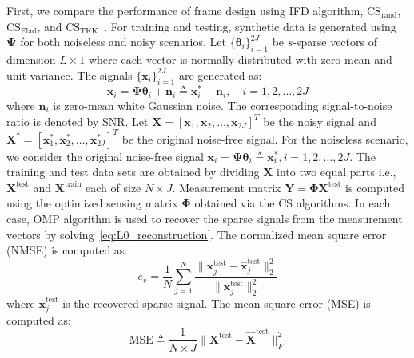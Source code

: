 First, we compare the performance of frame design using IFD algorithm, $\text{CS}_{\text{rand}}$, $\text{CS}_{\text{Elad}}$, and $\text{CS}_{\text{TKK}}$~\cite{Eva_frame}. For training and testing, synthetic data is generated using $\bm{\Psi}$ for both noiseless and noisy scenarios. Let $\{\bm{\theta}_{i}\}_{i=1}^{2J}$ be $s$-sparse vectors of dimension $L\times1$ where each vector is normally distributed with zero mean and unit variance. The signals $\{\bm{x}_{i}\}_{i=1}^{2J}$ are generated as:
%
\begin{equation}
    \label{eq: Signal_generation}
    \bm{x}_{i}= \bm{\Psi} \bm{\theta}_{i} + \bm{n}_{i} \triangleq \bm{x}_{i}^{*} + \bm{n}_{i}, \quad i=1,2,\dots,2J
\end{equation}
%
where $\bm{n}_{i}$ is zero-mean white Gaussian noise. The corresponding signal-to-noise ratio is denoted by SNR. Let $\bm{X}= \left[ \bm{x}_{1}, \bm{x}_{2},\dots,\bm{x}_{2J} \right]^{T}$ be the noisy signal and $\bm{X}^{*}= \left[ \bm{x}_{1}^{*}, \bm{x}_{2}^{*},\dots,\bm{x}_{2J}^{*} \right]^{T}$ be the original noise-free signal. For the noiseless scenario, we consider the original noise-free signal $\bm{x}_{i}= \bm{\Psi} \bm{\theta}_{i} \triangleq \bm{x}_{i}^{*}, i=1,2,\dots,2J$. The training and test data sets are obtained by dividing $\bm{X}$ into two equal parts i.e., $\bm{X}^{\text{test}}$ and $\bm{X}^{\text{train}}$ each of size $N\times J$. Measurement matrix $\bm{Y}=\bm{\Phi} \bm{X}^{\text{test}}$ is computed using the optimized sensing matrix $\bm{\Phi}$ obtained via the CS algorithms. In each case, OMP algorithm is used to recover the sparse signals from the measurement vectors by solving~\eqref{eq:L0_reconstruction}. The normalized mean square error (NMSE) is computed as:
%
\begin{equation}
\label{eq: NMSE_42}
e_{r} = \frac{1}{N} \sum_{j=1}^{N} \frac{\|\bm{x}_{j}^{\text{test}}-\widehat{\bm{x}}_{j}^{\text{test}}\|_{2}^{2}}{\|\bm{x}_{j}^{\text{test}}\|_{2}^{2}} 
\end{equation}
%
where $\widehat{\bm{x}}^{\text{test}}_{j}$ is the recovered sparse signal. The mean square error (MSE) is computed as:
%
\begin{equation}
    \label{eq: MSE_error}
    \text{MSE} \triangleq \frac{1}{N \times J} \|\bm{X}^{\text{test}}-\widehat{\bm{X}}^{\text{test}}\|_{F}^2
\end{equation}
